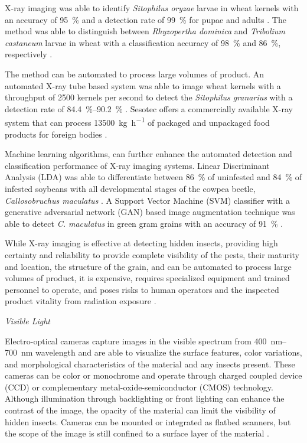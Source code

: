 \documentclass[../Vibro-Acoustic Signatures and Detection Algorithms for Stored Product Insects.tex]{subfiles}
\begin{document}
X-ray imaging was able to identify \textit{Sitophilus oryzae} larvae in wheat kernels with an accuracy of \SI{95}{\percent} and a detection rate of \SI{99}{\percent} for pupae and adults \cite{karunakaranSoftXrayInspection2003}. The method was able to distinguish between \textit{Rhyzopertha dominica} and \textit{Tribolium castaneum} larvae in wheat with a classification accuracy of \SI{98}{\percent} and \SI{86}{\percent}, respectively \cite{karunakaranIdentificationWheatKernels2004,karunakaranDetectionInternalWheat2004}.

The method can be automated to process large volumes of product. An automated X-ray tube based system was able to image wheat kernels with a throughput of 2500 kernels per second to detect the \textit{Sitophilus granarius} with a detection rate of \SIrange{84.4}{90.2}{\percent} \cite{haffRealtimeXrayInspection2004}. Sesotec offers a commercially available X-ray system that can process \SI{13500}{\kilo\gram\per\hour} of packaged and unpackaged food products for foreign bodies  \cite{XRayInspectionSystems2023}.

Machine learning algorithms, can further enhance the automated detection and classification performance of X-ray imaging systems. Linear Discriminant Analysis (LDA) was able to differentiate between \SI{86}{\percent} of uninfested and \SI{84}{\percent} of infested soybeans with all developmental stages of the cowpea beetle, \textit{Callosobruchus maculatus} \cite{chelladuraiDetectionCallosobruchusMaculatus2014}. A Support Vector Machine (SVM) classifier with a generative adversarial network (GAN) based image augmentation technique was able to detect \textit{C. maculatus} in green gram grains with an accuracy of \SI{91}{\percent} \cite{divyanthIdentificationGreenGram2022}.

While X-ray imaging is effective at detecting hidden insects, providing high certainty and reliability to provide complete visibility of the pests, their maturity and location, the structure of the grain,  and can be automated to process large volumes of product, it is expensive, requires specialized equipment and trained personnel to operate, and poses risks to human operators and the inspected product vitality from radiation exposure \cite{neethirajanDetectionTechniquesStoredProduct2007,zhuCurrentProgressInnovative2022}.

\newpage
\textit{Visible Light}

Electro-optical cameras capture images in the visible spectrum from \SIrange{400}{700}{\nano\meter} wavelength and are able to visualize the surface features, color variations, and morphological characteristics of the material and any insects present. These cameras can be color or monochrome and operate through charged coupled device (CCD) or complementary metal-oxide-semiconductor (CMOS) technology. Although illumination through backlighting or front lighting can enhance the contrast of the image, the opacity of the material can limit the visibility of hidden insects. Cameras can be mounted or integrated as flatbed scanners, but the scope of the image is still confined to a surface layer of the material \cite{vithuMachineVisionSystem2016}.
\end{document}
